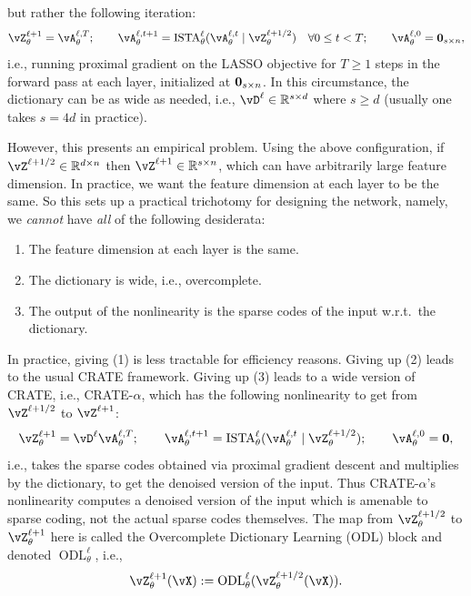 \documentclass[../../book-main.tex]{subfiles}
\begin{document}
but rather the following iteration:
\begin{equation}
    \vZ_{\theta}^{\ell + 1} = \vA_{\theta}^{\ell, T}; \qquad \vA_{\theta}^{\ell, t + 1} = \ISTA_{\theta}^{\ell}(\vA_{\theta}^{\ell, t} \mid \vZ_{\theta}^{\ell + 1/2}) \quad \forall 0 \leq t < T; \qquad \vA_{\theta}^{\ell, 0} = \vzero_{s \times n},
\end{equation}
i.e., running proximal gradient on the LASSO objective for \(T \geq 1\) steps in the forward pass at each layer, initialized at \(\bm{0}_{s \times n}\). In this circumstance, the dictionary can be as wide as needed, i.e., \(\vD^{\ell} \in \R^{s \times d}\) where \(s \geq d\) (usually one takes \(s = 4d\) in practice). 

However, this presents an empirical problem. Using the above configuration, if \(\vZ^{\ell + 1/2} \in \R^{d \times n}\) then \(\vZ^{\ell + 1} \in \R^{s \times n}\), which can have arbitrarily large feature dimension. In practice, we want the feature dimension at each layer to be the same. So this sets up a practical trichotomy for designing the network, namely, we \textit{cannot} have \textit{all} of the following desiderata:
\begin{enumerate}
    \item The feature dimension at each layer is the same.
    \item The dictionary is wide, i.e., overcomplete.
    \item The output of the nonlinearity is the sparse codes of the input w.r.t.~the dictionary.
\end{enumerate}
In practice, giving (1) is less tractable for efficiency reasons. Giving up (2) leads to the usual CRATE framework. Giving up (3) leads to a wide version of CRATE, i.e., CRATE-\(\alpha\), which has the following nonlinearity to get from \(\vZ^{\ell + 1/2}\) to \(\vZ^{\ell + 1}\):
\begin{equation}
    \vZ_{\theta}^{\ell + 1} = \vD^{\ell}\vA_{\theta}^{\ell, T}; \qquad \vA_{\theta}^{\ell, t + 1} = \ISTA_{\theta}^{\ell}(\vA_{\theta}^{\ell, t} \mid \vZ_{\theta}^{\ell + 1/2}); \qquad \vA_{\theta}^{\ell, 0} = \vzero,
\end{equation}
i.e., takes the sparse codes obtained via proximal gradient descent and multiplies by the dictionary, to get the denoised version of the input. Thus CRATE-\(\alpha\)'s nonlinearity computes a denoised version of the input which is amenable to sparse coding, not the actual sparse codes themselves. The map from \(\vZ_{\theta}^{\ell + 1/2}\) to \(\vZ_{\theta}^{\ell + 1}\) here is called the Overcomplete Dictionary Learning (ODL) block and denoted \(\operatorname{ODL}_{\theta}^{\ell}\), i.e.,
\begin{equation}
    \vZ_{\theta}^{\ell + 1}(\vX) := \operatorname{ODL}_{\theta}^{\ell}(\vZ_{\theta}^{\ell + 1/2}(\vX)).
\end{equation}
\end{document}
